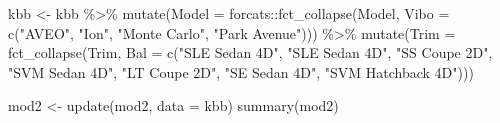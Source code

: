 \documentclass[
]{article}
\newenvironment{Shaded}{\begin{snugshade}}{\end{snugshade}}
\newcommand{\AttributeTok}[1]{\textcolor[rgb]{0.77,0.63,0.00}{#1}}
\newcommand{\FunctionTok}[1]{\textcolor[rgb]{0.00,0.00,0.00}{#1}}
\newcommand{\NormalTok}[1]{#1}
\newcommand{\OtherTok}[1]{\textcolor[rgb]{0.56,0.35,0.01}{#1}}
\newcommand{\SpecialCharTok}[1]{\textcolor[rgb]{0.00,0.00,0.00}{#1}}
\newcommand{\StringTok}[1]{\textcolor[rgb]{0.31,0.60,0.02}{#1}}
\begin{document}
\begin{Shaded}
\begin{Highlighting}[]
\NormalTok{kbb }\OtherTok{\textless{}{-}}\NormalTok{ kbb }\SpecialCharTok{\%\textgreater{}\%} 
  \FunctionTok{mutate}\NormalTok{(}\AttributeTok{Model =}\NormalTok{ forcats}\SpecialCharTok{::}\FunctionTok{fct\_collapse}\NormalTok{(Model, }
                    \AttributeTok{Vibo =} \FunctionTok{c}\NormalTok{(}\StringTok{"AVEO"}\NormalTok{, }\StringTok{"Ion"}\NormalTok{, }\StringTok{"Monte Carlo"}\NormalTok{, }\StringTok{"Park Avenue"}\NormalTok{))) }\SpecialCharTok{\%\textgreater{}\%} 
  \FunctionTok{mutate}\NormalTok{(}\AttributeTok{Trim =} \FunctionTok{fct\_collapse}\NormalTok{(Trim, }\AttributeTok{Bal =} \FunctionTok{c}\NormalTok{(}\StringTok{"SLE Sedan 4D"}\NormalTok{, }\StringTok{"SLE Sedan 4D"}\NormalTok{,}
                               \StringTok{"SS Coupe 2D"}\NormalTok{, }\StringTok{"SVM Sedan 4D"}\NormalTok{,}
                                \StringTok{"LT Coupe 2D"}\NormalTok{,}
                                  \StringTok{"SE Sedan 4D"}\NormalTok{,                                                                                    }
                              \StringTok{"SVM Hatchback 4D"}\NormalTok{)))}


\NormalTok{mod2 }\OtherTok{\textless{}{-}} \FunctionTok{update}\NormalTok{(mod2, }\AttributeTok{data =}\NormalTok{ kbb)}
\FunctionTok{summary}\NormalTok{(mod2)}
\end{Highlighting}
\end{Shaded}
\end{document}

